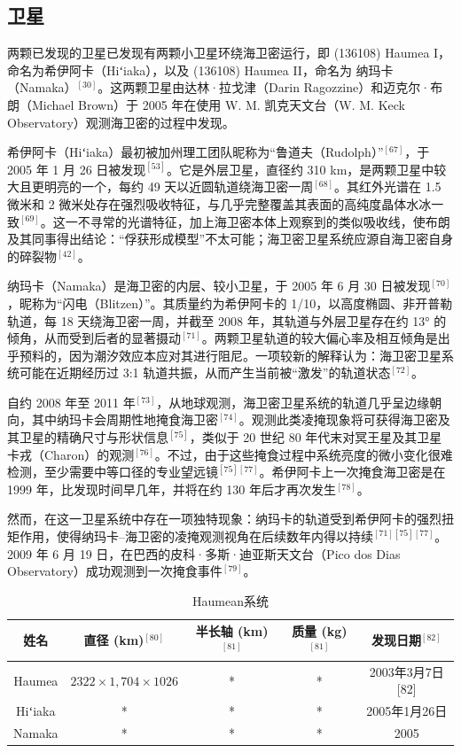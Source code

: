 \subsection{卫星}
两颗已发现的卫星已发现有两颗小卫星环绕海卫密运行，即 (136108) Haumea I，命名为希伊阿卡（Hiʻiaka），以及 (136108) Haumea II，命名为 纳玛卡（Namaka）$^{[30]}$。这两颗卫星由达林·拉戈津（Darin Ragozzine）和迈克尔·布朗（Michael Brown）于 2005 年在使用 W. M. 凯克天文台（W. M. Keck Observatory）观测海卫密的过程中发现。

希伊阿卡（Hiʻiaka）最初被加州理工团队昵称为“鲁道夫（Rudolph）”$^{[67]}$，于 2005 年 1 月 26 日被发现$^{[53]}$。它是外层卫星，直径约 310 km，是两颗卫星中较大且更明亮的一个，每约 49 天以近圆轨道绕海卫密一周$^{[68]}$。其红外光谱在 1.5 微米和 2 微米处存在强烈吸收特征，与几乎完整覆盖其表面的高纯度晶体水冰一致$^{[69]}$。这一不寻常的光谱特征，加上海卫密本体上观察到的类似吸收线，使布朗及其同事得出结论：“俘获形成模型”不太可能；海卫密卫星系统应源自海卫密自身的碎裂物$^{[42]}$。

纳玛卡（Namaka）是海卫密的内层、较小卫星，于 2005 年 6 月 30 日被发现$^{[70]}$，昵称为“闪电（Blitzen）”。其质量约为希伊阿卡的 1/10，以高度椭圆、非开普勒轨道，每 18 天绕海卫密一周，并截至 2008 年，其轨道与外层卫星存在约 13° 的倾角，从而受到后者的显著摄动$^{[71]}$。两颗卫星轨道的较大偏心率及相互倾角是出乎预料的，因为潮汐效应本应对其进行阻尼。一项较新的解释认为：海卫密卫星系统可能在近期经历过 3:1 轨道共振，从而产生当前被“激发”的轨道状态$^{[72]}$。

自约 2008 年至 2011 年$^{[73]}$，从地球观测，海卫密卫星系统的轨道几乎呈边缘朝向，其中纳玛卡会周期性地掩食海卫密$^{[74]}$。观测此类凌掩现象将可获得海卫密及其卫星的精确尺寸与形状信息$^{[75]}$，类似于 20 世纪 80 年代末对冥王星及其卫星卡戎（Charon）的观测$^{[76]}$。不过，由于这些掩食过程中系统亮度的微小变化很难检测，至少需要中等口径的专业望远镜$^{[75][77]}$。希伊阿卡上一次掩食海卫密是在 1999 年，比发现时间早几年，并将在约 130 年后才再次发生$^{[78]}$。

然而，在这一卫星系统中存在一项独特现象：纳玛卡的轨道受到希伊阿卡的强烈扭矩作用，使得纳玛卡–海卫密的凌掩观测视角在后续数年内得以持续$^{[71][75][77]}$。2009 年 6 月 19 日，在巴西的皮科·多斯·迪亚斯天文台（Pico dos Dias Observatory）成功观测到一次掩食事件$^{[79]}$。
\begin{table}[ht]
\centering
\caption{Haumean系统}\label{tab_Haumea1}
\begin{tabular}{|c|c|c|c|c|}
\hline
\textbf{姓名}&\textbf{直径 (km)$^{[80]}$} & \textbf{半长轴 (km)$^{[81]}$} & \textbf{质量 (kg)$^{[81]}$} & \textbf{发现日期$^{[82]}$} \\
\hline
Haumea &$2 322 \times 1,704 × 1026$ & * & * & 2003年3月7日[82] \\
\hline
Hiʻiaka& * & * & * & 2005年1月26日 \\
\hline
Namaka& * & * & * & 2005 \\
\hline
\end{tabular}
\end{table}
